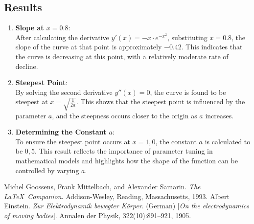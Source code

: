 \documentclass[a4paper,12pt]{article}
\begin{document}
\subsection*{Results}
\begin{enumerate}
    \item \textbf{Slope at $x = 0.8$}: \\ %
    After calculating the derivative $y'\left(x\right) = -x \cdot e^{-x^2}$,
    substituting $x=0.8$, the slope of the curve at that point is approximately
    $-0.42$. This indicates that the curve is decreasing at this point,
    with a relatively moderate rate of decline.
    \item \textbf{Steepest Point}: \\ %
    By solving the second derivative $y''\left(x\right) = 0$, the curve is
    found to be steepest at $x = \sqrt{\frac{1}{2a}}$. This shows that the
    steepest point is influenced by the parameter $a$, and the steepness occurs
    closer to the origin as $a$ increases.
    \item \textbf{Determining the Constant $a$}: \\ %
    To ensure the steepest point occurs at $x = 1,0$, the constant $a$ is
    calculated to be $0,5$. This result reflects the importance of parameter
    tuning in mathematical models and highlights how the shape of the function
    can be controlled by varying $a$.
\end{enumerate}
%
\begin{thebibliography}{99}
%
Michel Goossens, Frank Mittelbach, and Alexander Samarin. 
\textit{The \LaTeX\ Companion}. 
Addison-Wesley, Reading, Massachusetts, 1993.
%
Albert Einstein. 
\textit{Zur Elektrodynamik bewegter K{\"o}rper}. (German) 
[\textit{On the electrodynamics of moving bodies}]. 
Annalen der Physik, 322(10):891–921, 1905.
%
\end{thebibliography}
%
\end{document}
